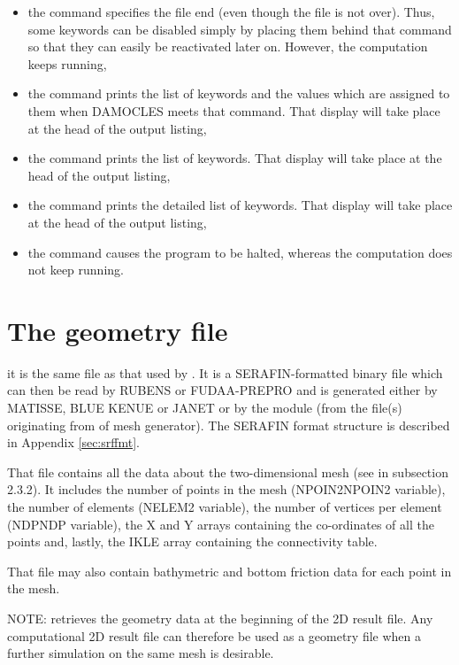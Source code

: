 \begin{itemize}
\item the  command specifies the file end (even though the
file is not over). Thus, some keywords can be disabled simply by placing them
behind that command so that they can easily be reactivated later on. However,
the computation keeps running,

\item the  command prints the list of keywords and the
values which are assigned to them when DAMOCLES meets that command. That
display will take place at the head of the output listing,

\item the  command prints the list of keywords. That
display will take place at the head of the output listing,

\item the  command prints the detailed list of keywords.
That display will take place at the head of the output listing,

\item the  command causes the program to be halted, whereas
the computation does not keep running.
\end{itemize}

\section{The geometry file}

it is the same file as that used by . It is a SERAFIN-formatted
binary file which can then be read by RUBENS or FUDAA-PREPRO and is generated
either by MATISSE, BLUE KENUE or JANET or by the \stbtel module (from the
file(s) originating from of mesh generator). The SERAFIN format structure is
described in Appendix \ref{sec:srffmt}.

That file contains all the data about the two-dimensional mesh (see in
subsection 2.3.2). It includes the number of points in the mesh (NPOIN2NPOIN2
variable), the number of elements (NELEM2 variable), the number of vertices per
element (NDPNDP variable), the X and Y arrays containing the co-ordinates of
all the points and, lastly, the IKLE array containing the connectivity table.

That file may also contain bathymetric and bottom friction data for each point
in the mesh.

NOTE:  retrieves the geometry data at the beginning of the 2D result
file. Any computational 2D result file can therefore be used as a geometry file
when a further simulation on the same mesh is desirable.

